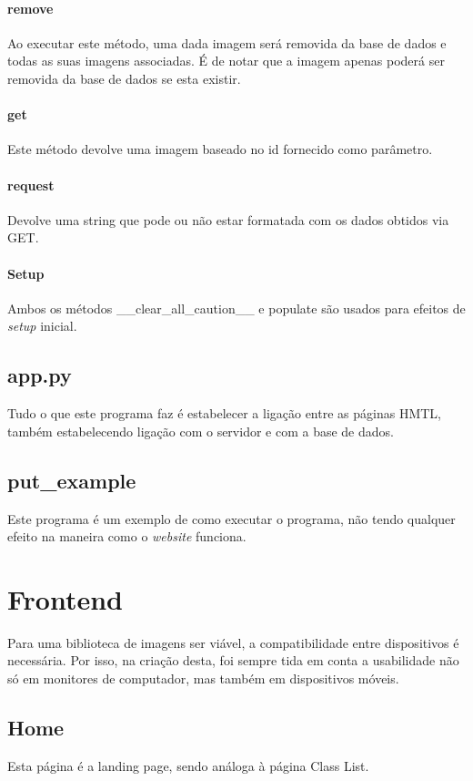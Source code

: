 \documentclass{report}
\begin{document}
\paragraph{remove}
Ao executar este método, uma dada imagem será removida da base de dados e todas as suas imagens associadas. É de notar que a imagem apenas poderá ser removida da base de dados se esta existir.

\paragraph{get}
Este método devolve uma imagem baseado no id fornecido como parâmetro. 

\paragraph{request}
Devolve uma string que pode ou não estar formatada com os dados obtidos via GET.

\paragraph{Setup}
Ambos os métodos \_\_clear\_all\_caution\_\_ e  populate são usados para efeitos de \textit{setup} inicial.

\subsection{app.py}
Tudo o que este programa faz é estabelecer a ligação entre as páginas HMTL, também estabelecendo ligação com o servidor e com a base de dados. 

\subsection{put\_example}
Este programa é um exemplo de como executar o programa, não tendo qualquer efeito na maneira como o \textit{website} funciona.

\section{Frontend}
Para uma biblioteca de imagens ser viável, a compatibilidade entre dispositivos é necessária. Por isso, na criação desta, foi sempre tida em conta a usabilidade não só em monitores de computador, mas também em dispositivos móveis. 

\subsection{Home}
Esta página é a landing page, sendo análoga à página Class List.
\end{document}
